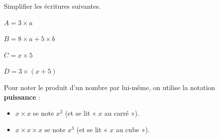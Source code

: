 \documentclass[a4paper]{book}
\begin{document}
    
    \begin{exemple}
        Simplifier les écritures suivantes.

        \medskip

        \begin{minipage}{0.24\linewidth}
            $A=3\times a$

            \vspace{1cm}
        \end{minipage}
        \hfill\vline\hfill
        \begin{minipage}{0.24\linewidth}
            $B=8\times a+5\times b$

            \vspace{1cm}
        \end{minipage}
        \hfill\vline\hfill
        \begin{minipage}{0.24\linewidth}
            $C=x\times 5$

            \vspace{1cm}
        \end{minipage}
        \hfill\vline\hfill
        \begin{minipage}{0.24\linewidth}
            $D=3\times (x+5)$

            \vspace{1cm}
        \end{minipage}
    \end{exemple}


    \begin{convention}
        Pour noter le produit d'un nombre par lui-même, on utilise la notation \textbf{puissance} :
        \begin{itemize}
            \item $x \times x$ se note \textbf{$x^2$} (et se lit « $x$ au carré »).
            \item $x \times x \times x$ se note \textbf{$x^3$} (et se lit « $x$ au cube »).
        \end{itemize}
    \end{convention}
    
\end{document}
